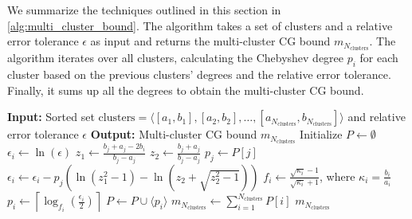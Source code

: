 We summarize the techniques outlined in this section in \cref{alg:multi_cluster_bound}. The algorithm takes a set of clusters and a relative error tolerance $\epsilon$ as input and returns the multi-cluster CG bound $m_{N_{\text{clusters}}}$. The algorithm iterates over all clusters, calculating the Chebyshev degree $p_i$ for each cluster based on the previous clusters' degrees and the relative error tolerance. Finally, it sums up all the degrees to obtain the multi-cluster CG bound.
\begin{algorithm}[H]
    \caption{$\operatorname{MultiClusterBound}(\text{clusters}, \epsilon)$}
    \begin{algorithmic}[1]
        \State \textbf{Input:} Sorted set $\text{clusters} = \langle[a_1, b_1], [a_2, b_2], \ldots, [a_{N_{\text{clusters}}}, b_{N_{\text{clusters}}}]\rangle$ and relative error tolerance $\epsilon$
        \State \textbf{Output:} Multi-cluster CG bound $m_{N_{\text{clusters}}}$
        \State Initialize $P \gets \emptyset$
            \State $\epsilon_i \gets \ln(\epsilon)$
             
                \State $z_1 \gets \frac{b_j + a_j - 2b_i}{b_j - a_j}$
                \State $z_2 \gets \frac{b_j + a_j}{b_j - a_j}$
                \State $p_j \gets P[j]$
                \State $\epsilon_i \gets \epsilon_i - p_j \left(\ln(z_1^2 -1) - \ln\left(z_2 + \sqrt{z_2^2 -1}\right)\right)$
            \EndFor
            \State $f_i \gets \frac{\sqrt{\kappa_i} - 1}{\sqrt{\kappa_i} + 1}$, where $\kappa_i = \frac{b_i}{a_i}$
            \State $p_i \gets \left\lceil\log_{f_i}\left(\frac{\epsilon_i}{2}\right)\right\rceil$
            \State $P \gets P \cup \langle p_i \rangle$
        \EndFor
        \State $m_{N_{\text{clusters}}} \gets \sum_{i=1}^{N_{\text{clusters}}} P[i]$
        \State \Return $m_{N_{\text{clusters}}}$
    \end{algorithmic}
    \label{alg:multi_cluster_bound}
\end{algorithm}

